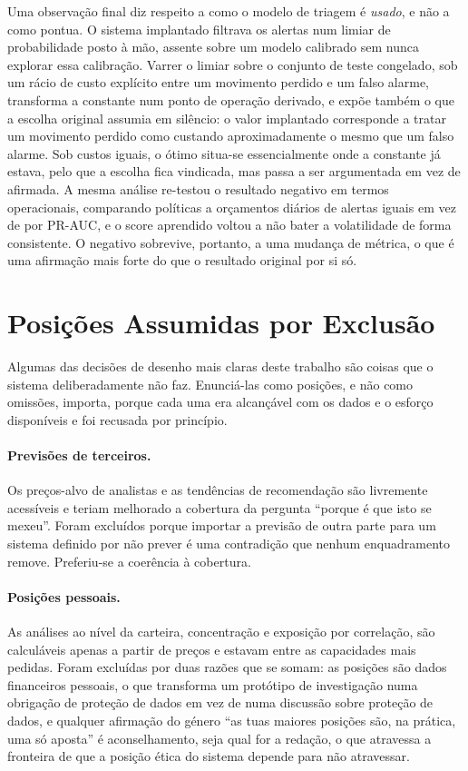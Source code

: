 Uma observação final diz respeito a como o modelo de triagem é \emph{usado}, e não a como pontua. O
sistema implantado filtrava os alertas num limiar de probabilidade posto à mão, assente sobre um
modelo calibrado sem nunca explorar essa calibração. Varrer o limiar sobre o conjunto de teste
congelado, sob um rácio de custo explícito entre um movimento perdido e um falso alarme, transforma
a constante num ponto de operação derivado, e expõe também o que a escolha original assumia em
silêncio: o valor implantado corresponde a tratar um movimento perdido como custando
aproximadamente o mesmo que um falso alarme. Sob custos iguais, o ótimo situa-se essencialmente onde
a constante já estava, pelo que a escolha fica vindicada, mas passa a ser argumentada em vez de
afirmada. A mesma análise re-testou o resultado negativo em termos operacionais, comparando
políticas a orçamentos diários de alertas iguais em vez de por PR-AUC, e o score aprendido voltou a
não bater a volatilidade de forma consistente. O negativo sobrevive, portanto, a uma mudança de
métrica, o que é uma afirmação mais forte do que o resultado original por si só.

\section{Posições Assumidas por Exclusão}
\label{sec:concl_exclusions}

Algumas das decisões de desenho mais claras deste trabalho são coisas que o sistema deliberadamente
não faz. Enunciá-las como posições, e não como omissões, importa, porque cada uma era alcançável com
os dados e o esforço disponíveis e foi recusada por princípio.

\paragraph{Previsões de terceiros.} Os preços-alvo de analistas e as tendências de recomendação são
livremente acessíveis e teriam melhorado a cobertura da pergunta ``porque é que isto se mexeu''.
Foram excluídos porque importar a previsão de outra parte para um sistema definido por não prever é
uma contradição que nenhum enquadramento remove. Preferiu-se a coerência à cobertura.

\paragraph{Posições pessoais.} As análises ao nível da carteira, concentração e exposição por
correlação, são calculáveis apenas a partir de preços e estavam entre as capacidades mais pedidas.
Foram excluídas por duas razões que se somam: as posições são dados financeiros pessoais, o que
transforma um protótipo de investigação numa obrigação de proteção de dados em vez de numa discussão
sobre proteção de dados, e qualquer afirmação do género ``as tuas maiores posições são, na prática,
uma só aposta'' é aconselhamento, seja qual for a redação, o que atravessa a fronteira de que a
posição ética do sistema depende para não atravessar.

